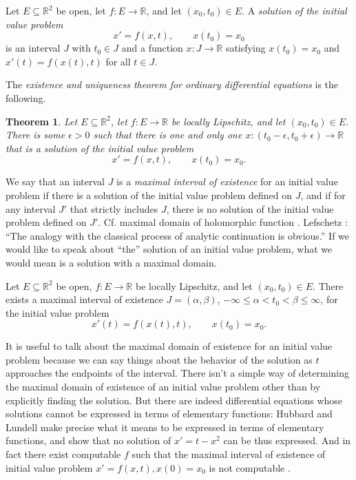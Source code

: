 \documentclass{article}
\newtheorem{theorem}{Theorem}
\begin{document}
Let $E \subseteq \mathbb{R}^2$ be open, let $f:E \to \mathbb{R}$, and let
$(x_0,t_0) \in E$. A {\em solution of the initial value problem}
\[
x'=f(x,t), \qquad x(t_0)=x_0
\]
is an interval $J$ with $t_0 \in J$ and a function $x:J \to \mathbb{R}$ satisfying $x(t_0)=x_0$ and $x'(t)=f(x(t),t)$ for all $t \in J$.

The {\em existence and uniqueness theorem for ordinary differential equations} is the following.

\begin{theorem}
Let $E \subseteq \mathbb{R}^2$, let $f:E \to \mathbb{R}$ be locally Lipschitz, and let $(x_0,t_0) \in E$. There is some
$\epsilon>0$ such that there is one and only one $x:(t_0-\epsilon,t_0+\epsilon) \to \mathbb{R}$ that is a solution of the initial value problem
\[
x'=f(x,t), \qquad x(t_0)=x_0.
\]
\end{theorem}

We say that an interval $J$ is a {\em maximal interval of existence} for an initial value problem if there is a solution
of the initial value problem defined on $J$, and if for any interval $J'$ that strictly includes $J$, there is no solution
of the initial value problem defined on $J'$. Cf. maximal domain of holomorphic function \cite[p.~112, \S 2]{remmert}. Lefschetz  \cite[p.~35]{lefschetz}: ``The analogy with the classical process of
analytic continuation is obvious.'' If we would like to speak about ``the'' solution of an initial value problem, what we would mean is a solution with a maximal domain.

Let $E \subseteq \mathbb{R}^2$ be open, $f:E \to \mathbb{R}$ be locally Lipschitz, and let
$(x_0,t_0) \in E$. There exists \cite[p.~51, Theorem 2.13]{teschl} a maximal interval of existence $J=(\alpha,\beta)$, $-\infty \leq \alpha< t_0 <\beta \leq \infty$,
for the initial value problem
\[
x'(t)=f(x(t),t), \qquad x(t_0)=x_0.
\]

It is useful to talk about the maximal domain of existence for an initial value problem
because we can say things about the behavior of the solution as $t$ approaches the endpoints
of the interval. There isn't a simple way of determining the maximal domain of existence of an initial value problem
other than by explicitly finding the solution. But there are indeed differential equations whose solutions cannot be expressed in terms of elementary functions: Hubbard 
and Lundell \cite{hubbard} make precise what it means to be expressed in terms of elementary functions, and
show that no solution of $x'=t-x^2$ can be thus expressed. And in fact there exist computable $f$ such that the maximal interval of existence of
initial value problem $x'=f(x,t), x(0)=x_0$
is not computable \cite{MR2485412}.
\end{document}
